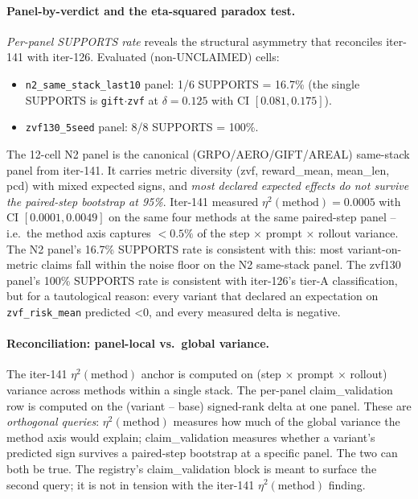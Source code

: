\documentclass{article}
\begin{document}
\paragraph{Panel-by-verdict and the eta-squared paradox test.}
\textit{Per-panel SUPPORTS rate} reveals the structural asymmetry that
reconciles iter-141 with iter-126.  Evaluated (non-UNCLAIMED) cells:
\begin{itemize}
\item \texttt{n2\_same\_stack\_last10} panel: 1/6 SUPPORTS = 16.7\%
(the single SUPPORTS is \texttt{gift}$\cdot$\texttt{zvf} at $\delta=0.125$
with CI $[0.081, 0.175]$).
\item \texttt{zvf130\_5seed} panel: 8/8 SUPPORTS = 100\%.
\end{itemize}
The 12-cell N2 panel is the canonical (GRPO/AERO/GIFT/AREAL) same-stack
panel from iter-141.  It carries metric diversity
(zvf, reward\_mean, mean\_len, pcd) with mixed expected signs, and
\emph{most declared expected effects do not survive the paired-step
bootstrap at 95\%}.  Iter-141 measured $\eta^2(\text{method}) = 0.0005$
with CI $[0.0001, 0.0049]$ on the same four methods at the same
paired-step panel -- i.e.\ the method axis captures $< 0.5\%$ of the
step $\times$ prompt $\times$ rollout variance.  The N2 panel's 16.7\%
SUPPORTS rate is consistent with this: most variant-on-metric claims
fall within the noise floor on the N2 same-stack panel.  The zvf130
panel's 100\% SUPPORTS rate is consistent with iter-126's tier-A
classification, but for a tautological reason: every variant that
declared an expectation on \texttt{zvf\_risk\_mean} predicted
\textless 0, and every measured delta is negative.

\paragraph{Reconciliation: panel-local vs.\ global variance.}
The iter-141 $\eta^2(\text{method})$ anchor is computed on
(step $\times$ prompt $\times$ rollout) variance across methods within a
single stack.  The per-panel claim\_validation row is computed on the
(variant -- base) signed-rank delta at one panel.  These are
\emph{orthogonal queries}: $\eta^2(\text{method})$ measures how much of
the global variance the method axis would explain; claim\_validation
measures whether a variant's predicted sign survives a paired-step
bootstrap at a specific panel.  The two can both be true.  The registry's
claim\_validation block is meant to surface the second query; it is not
in tension with the iter-141 $\eta^2(\text{method})$ finding.
\end{document}
